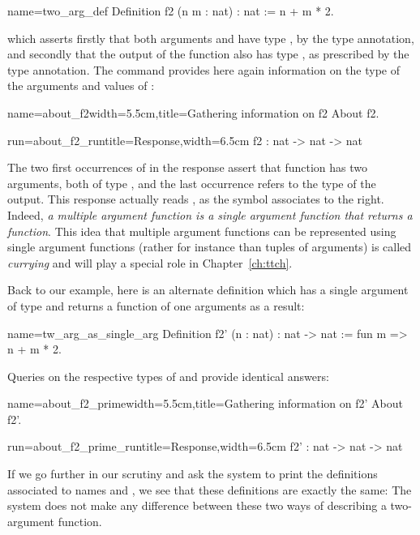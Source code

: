 \begin{coq}{name=two_arg_def}{}
Definition f2 (n m : nat) : nat :=
  n + m * 2.
\end{coq}
which asserts firstly that both arguments  and  have type
, by the  type annotation, and secondly that the
output of the function also has type , as prescribed by the
 type annotation. The   command provides
here again information on the type of the arguments and values of
:
\begin{coq}{name=about_f2}{width=5.5cm,title=Gathering information on f2}
About f2.
\end{coq}
\begin{coqout}{run=about_f2_run}{title=Response,width=6.5cm}
f2 : nat -> nat -> nat
\end{coqout}
The two first occurrences of  in the response
  assert that function  has two arguments,
 both of type , and the last occurrence refers to the type of
 the output. This response actually reads ,
 as the \C{->} symbol associates to the right. Indeed, {\em a multiple
 argument function is a single argument function that returns a
 function}.  This idea that multiple argument functions can be
represented using single argument functions (rather for instance than
tuples of arguments) is called {\em currying} and will play a special
role in Chapter~\ref{ch:ttch}.


Back to our example, here is an alternate definition
  which has a single argument  of type  and returns
 a function of one arguments as a result:

\begin{coq}{name=tw_arg_as_single_arg}{}
Definition f2' (n : nat) : nat -> nat := fun m => n + m * 2.
\end{coq}

Queries on the respective types of  and  provide identical answers:
\begin{coq}{name=about_f2_prime}{width=5.5cm,title=Gathering information on f2'}
About f2'.
\end{coq}
\begin{coqout}{run=about_f2_prime_run}{title=Response,width=6.5cm}
f2' : nat -> nat -> nat
\end{coqout}

If we go further in our scrutiny and ask the \Coq{} system to print
the definitions associated to names  and , we see that these
definitions are exactly the same: The \Coq{} system does not make any
difference between these two ways of describing a two-argument function.

